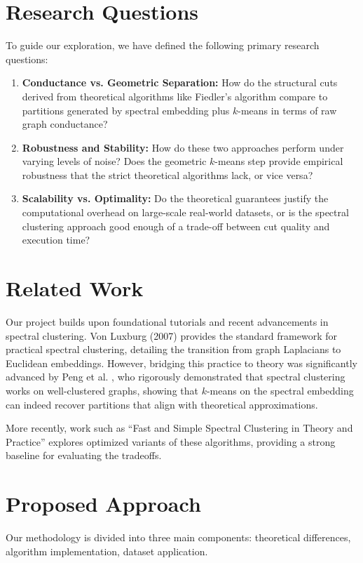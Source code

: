 \documentclass{article}
\theoremstyle{definition}
\theoremstyle{remark}
\begin{document}
\section{Research Questions}
To guide our exploration, we have defined the following primary research questions:
\begin{enumerate}
    \item \textbf{Conductance vs. Geometric Separation:} How do the structural cuts derived from theoretical algorithms like Fiedler's algorithm compare to partitions generated by spectral embedding plus $k$-means in terms of raw graph conductance?
    \item \textbf{Robustness and Stability:} How do these two approaches perform under varying levels of noise? Does the geometric $k$-means step provide empirical robustness that the strict theoretical algorithms lack, or vice versa?
    \item \textbf{Scalability vs. Optimality:} Do the theoretical guarantees justify the computational overhead on large-scale real-world datasets, or is the spectral clustering approach good enough of a trade-off between cut quality and execution time?
\end{enumerate}

\section{Related Work}
Our project builds upon foundational tutorials and recent advancements in spectral clustering. Von Luxburg (2007) \cite{luxburg2007tutorial} provides the standard framework for practical spectral clustering, detailing the transition from graph Laplacians to Euclidean embeddings. However, bridging this practice to theory was significantly advanced by Peng et al. \cite{peng2015partitioning}, who rigorously demonstrated that spectral clustering works on well-clustered graphs, showing that $k$-means on the spectral embedding can indeed recover partitions that align with theoretical approximations. 

More recently, work such as ``Fast and Simple Spectral Clustering in Theory and Practice'' \cite{bravo2023fast} explores optimized variants of these algorithms, providing a strong baseline for evaluating the tradeoffs.

\section{Proposed Approach}
Our methodology is divided into three main components: theoretical differences, algorithm implementation, dataset application.
\end{document}
